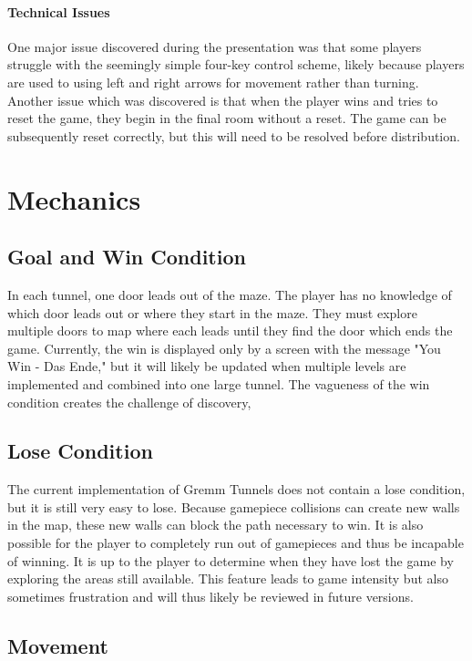 \documentclass{scrreprt}
\begin{document}
				\subsubsection{Technical Issues}
					One major issue discovered during the presentation was that some players struggle with the seemingly simple four-key control scheme, likely because players are used to using left and right arrows for movement rather than turning. Another issue which was discovered is that when the player wins and tries to reset the game, they begin in the final room without a reset. The game can be subsequently reset correctly, but this will need to be resolved before distribution.								
	
	\chapter{Mechanics}
		
		\section{Goal and Win Condition}
			In each tunnel, one door leads out of the maze. The player has no knowledge of which door leads out or where they start in the maze. They must explore multiple doors to map where each leads until they find the door which ends the game. Currently, the win is displayed only by a screen with the message "You Win - Das Ende," but it will likely be updated when multiple levels are implemented and combined into one large tunnel. The vagueness of the win condition creates the challenge of discovery, 
		
		\section{Lose Condition}
			The current implementation of Gremm Tunnels does not contain a lose condition, but it is still very easy to lose. Because gamepiece collisions can create new walls in the map, these new walls can block the path necessary to win. It is also possible for the player to completely run out of gamepieces and thus be incapable of winning. It is up to the player to determine when they have lost the game by exploring the areas still available. This feature leads to game intensity but also sometimes frustration and will thus likely be reviewed in future versions.
			
		\section{Movement}
			
\end{document}
